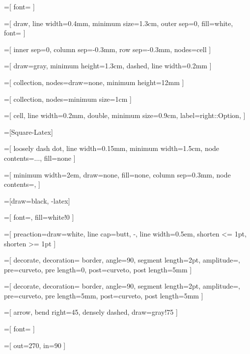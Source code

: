 \newcommand{\true}{\textcolor{green}{\ding{51}}}
\newcommand{\false}{\textcolor{red}{\ding{55}}}

=[
  font=\large
]

=[
  draw,
  line width=0.4mm,
  minimum size=1.3cm,
  outer sep=0,
  fill=white,
  font=\large
]

=[
  inner sep=0,
  column sep=-0.3mm,
  row sep=-0.3mm,
  nodes=cell
]

=[
  draw=gray,
  minimum height=1.3cm,
  dashed,
  line width=0.2mm
]

=[
  collection,
  nodes={draw=none, minimum height=12mm}
]

=[
  collection,
  nodes={minimum size=1cm }
]

=[
  cell,
  line width=0.2mm,
  double,
  minimum size=0.9cm,
  label={right::Option},
]

=[Square-Latex]

=[
  loosely dash dot,
  line width=0.15mm,
  minimum width=1.5cm,
  node contents=$\ldots$,
  fill=none
]

\newcommand{\ellipsis}{ \node [ellipsis]; }

=[
  minimum width=2em,
  draw=none,
  fill=none,
  column sep=0.3mm,
  node contents={,}
]

\newcommand{\tuplecomma}{ \node [tuple comma]; }

=[draw=black, -latex]

=[
  font=\small,
  fill=white!0
]

=[
  preaction={draw=white, line cap=butt, -, line width=0.5em},
  shorten <= 1pt,
  shorten >= 1pt
]

=[
  decorate,
  decoration={
    border, angle=90, segment length=2pt, amplitude=\pgflinewidth,
    pre=curveto, pre length=0, post=curveto, post length=5mm
  }
]

=[
  decorate,
  decoration={
    border, angle=90, segment length=2pt, amplitude=\pgflinewidth,
    pre=curveto, pre length=5mm, post=curveto, post length=5mm
  }
]

=[
  arrow,
  bend right=45,
  densely dashed,
  draw=gray!75
]

=[
  font=\small
]

=[
  out=270,
  in=90
]

